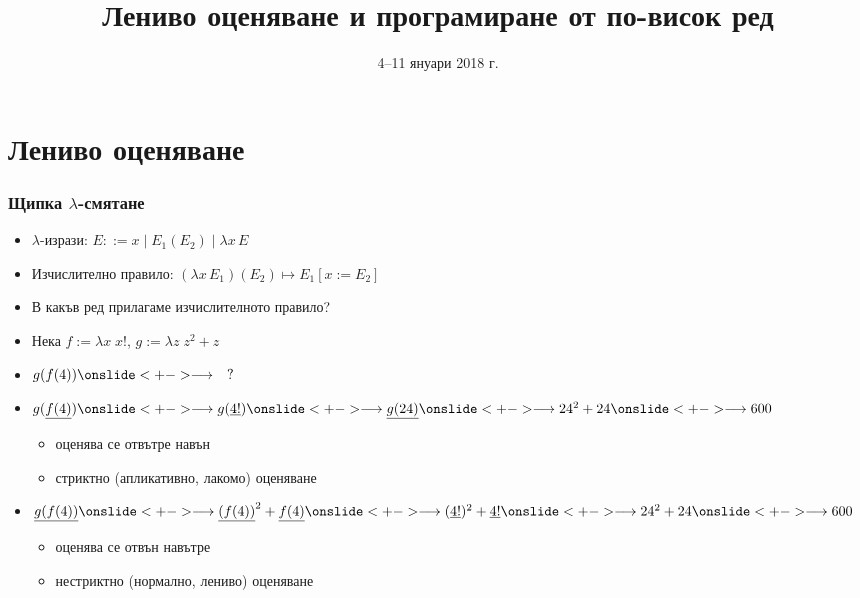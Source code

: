 \documentclass{beamer}
\title[Лениво оценяване]{Лениво оценяване и програмиране от по-висок ред}
\date{4--11 януари 2018 г.}
\newcommand{\lra}{\onslide<+->$\longrightarrow$\xspace}
\begin{document}
\begin{frame}
  \titlepage
\end{frame}

\section{Лениво оценяване}

\begin{frame}
  \frametitle{Щипка $\lambda$-смятане}

  \renewcommand{\lra}{\onslide<+->\longrightarrow\xspace}
  \begin{itemize}[<+->]
  \item $\lambda$-изрази: $E ::= x \;|\; E_1(E_2) \;|\; \lambda x\, E$
  \item Изчислително правило: $(\lambda x\,E_1)(E_2) \mapsto E_1[x := E_2]$
  \item В какъв ред прилагаме изчислителното правило?
  \item Нека $f := \lambda x\; x!$, $g := \lambda z\;z^2+z$
  \item $g(f(4)) \lra \quad ?$
  \item $g(\underline{f(4)})
    \lra g(\underline{4!})
    \lra \underline{g(24)}
    \lra 24^2 + 24
    \lra 600$
    \begin{itemize}
    \item<16-> оценява се \alert{отвътре навън}
    \item<17-> \alert{стриктно} (апликативно, лакомо) оценяване
    \end{itemize}
  \item $\underline{g(f(4))}
    \lra \underline{(f(4))}^2 + \underline{f(4)}
    \lra (\underline{4!})^2 + \underline{4!}
    \lra 24^2 + 24
    \lra 600$
    \begin{itemize}
    \item<16-> оценява се \alert{отвън навътре}
    \item<17-> \alert{нестриктно} (нормално, лениво) оценяване
    \end{itemize}
  \end{itemize}
\end{frame}
\end{document}
